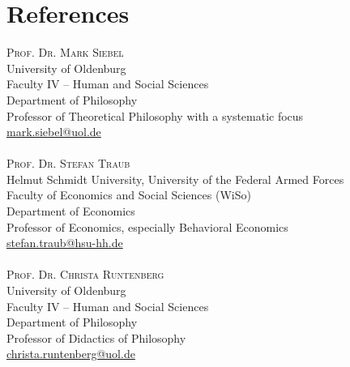 \documentclass[a4paper,10pt]{article}
\begin{document}
\clearpage
\section{References}
\textsc{Prof. Dr. Mark Siebel}\\
University of Oldenburg\\
Faculty IV -- Human and Social Sciences\\
Department of Philosophy\\
Professor of Theoretical Philosophy with a systematic focus\\
\href{mailto:mark.siebel@uol.de}{mark.siebel@uol.de}\\
\\
\textsc{Prof. Dr. Stefan Traub}\\
Helmut Schmidt University, University of the Federal Armed Forces\\
Faculty of Economics and Social Sciences (WiSo)\\
Department of Economics\\
Professor of Economics, especially Behavioral Economics\\
\href{mailto:stefan.traub@hsu-hh.de}{stefan.traub@hsu-hh.de}\\
\\
\textsc{Prof. Dr. Christa Runtenberg}\\
University of Oldenburg\\
Faculty IV -- Human and Social Sciences\\
Department of Philosophy\\
Professor of Didactics of Philosophy\\
\href{mailto:christa.runtenberg@uol.de}{christa.runtenberg@uol.de}\\
\end{document}
